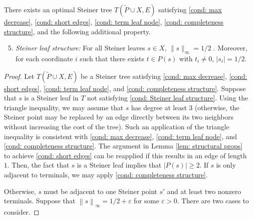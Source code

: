 \documentclass{article}\providecommand{\DeclareRedundantLanguages}[2]{}\usepackage[a4paper,margin=20mm]{geometry}
\newcommand{\1}{\textbf{1}}
\newcommand{\norm}[1]{\left\lVert#1\right\rVert}
\renewcommand{\tilde}{\widetilde}
\begin{document}
\begin{lemma} \label{lem: Steiner leaf struct}
There exists an optimal Steiner tree  $T(\tilde{P} \cup X, E)$ satisfying \ref{cond: max decrease}, \ref{cond: short edges}, \ref{cond: term leaf node}, \ref{cond: completeness structure}, and the following additional property.

\begin{enumerate}[label=(P\arabic*)]
\setcounter{enumi}{4}
    \item \textit{Steiner leaf structure:}  For all Steiner leaves $s \in X$, $\|s\|_{\infty} = 1/2$ \label{cond: Steiner leaf structure}. Moreover, for each coordinate $i$ such that there exists $t \in P(s)$ with $t_i \neq 0$, $|s_i| = 1/2$.
\end{enumerate}
\end{lemma}
\begin{proof}
Let $T(\tilde{P} \cup X, E)$ be a Steiner tree satisfying \ref{cond: max decrease}, \ref{cond: short edges}, \ref{cond: term leaf node}, and \ref{cond: completeness structure}. Suppose that  $s$ is a Steiner leaf in $T$ not satisfying \ref{cond: Steiner leaf structure}. Using the triangle inequality, we may assume that $s$ has degree at least $3$ (otherwise, the Steiner point may be replaced by an edge directly between its two neighbors without increasing the cost of the tree). Such an application of the triangle inequality is consistent with \ref{cond: max decrease}, \ref{cond: term leaf node}, and \ref{cond: completeness structure}. The argument in Lemma \ref{lem: structural props} to achieve \ref{cond: short edges} can be reapplied if this results in an edge of length $1$. Then, the fact that $s$ is a Steiner leaf implies that $|P(s)| \geq 2$. If $s$ is only adjacent to terminals, we may apply \ref{cond: completeness structure}.

Otherwise, $s$ must be adjacent to one Steiner point $s'$ and at least two nonzero terminals. Suppose that $\norm{s}_{\infty} = 1/2 + \varepsilon$ for some $\varepsilon > 0$. There are two cases to consider. 


\end{proof}
\end{document}
